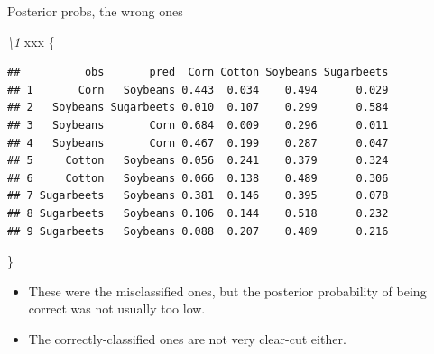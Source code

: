 \documentclass[ignorenonframetext,]{beamer}
\newenvironment{Shaded}{\begin{snugshade}}{\end{snugshade}}
\newcommand{\DataTypeTok}[1]{\textcolor[rgb]{0.13,0.29,0.53}{#1}}
\newcommand{\DecValTok}[1]{\textcolor[rgb]{0.00,0.00,0.81}{#1}}
\newcommand{\KeywordTok}[1]{\textcolor[rgb]{0.13,0.29,0.53}{\textbf{#1}}}
\newcommand{\NormalTok}[1]{#1}
\newcommand{\OperatorTok}[1]{\textcolor[rgb]{0.81,0.36,0.00}{\textbf{#1}}}
\newcommand{\StringTok}[1]{\textcolor[rgb]{0.31,0.60,0.02}{#1}}
\begin{document}
\begin{frame}[fragile]{Posterior probs, the wrong ones}
\protect\hypertarget{posterior-probs-the-wrong-ones}{}

\emph{\textbackslash{}1} xxx \{\footnotesize  

\begin{Shaded}
\end{Shaded}

\begin{verbatim}
##          obs       pred  Corn Cotton Soybeans Sugarbeets
## 1       Corn   Soybeans 0.443  0.034    0.494      0.029
## 2   Soybeans Sugarbeets 0.010  0.107    0.299      0.584
## 3   Soybeans       Corn 0.684  0.009    0.296      0.011
## 4   Soybeans       Corn 0.467  0.199    0.287      0.047
## 5     Cotton   Soybeans 0.056  0.241    0.379      0.324
## 6     Cotton   Soybeans 0.066  0.138    0.489      0.306
## 7 Sugarbeets   Soybeans 0.381  0.146    0.395      0.078
## 8 Sugarbeets   Soybeans 0.106  0.144    0.518      0.232
## 9 Sugarbeets   Soybeans 0.088  0.207    0.489      0.216
\end{verbatim}

\}

\begin{itemize}
\item
  These were the misclassified ones, but the posterior probability of
  being correct was not usually too low.
\item
  The correctly-classified ones are not very clear-cut either.
\end{itemize}

\end{frame}
\end{document}
